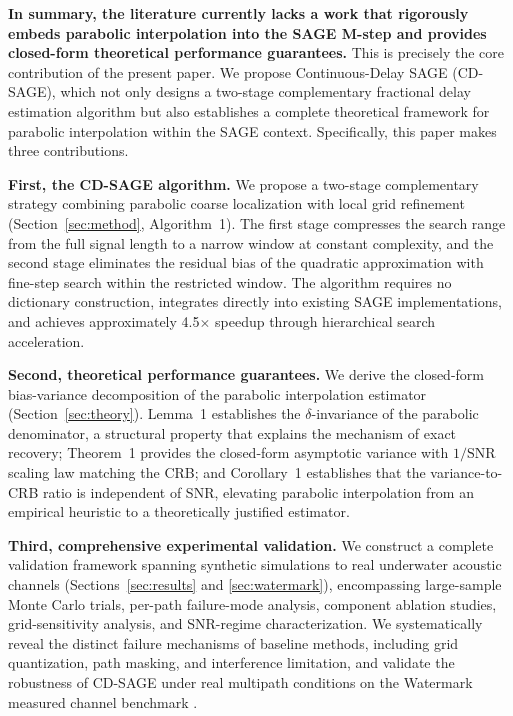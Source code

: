 \documentclass[a4paper,fleqn]{cas-dc}
\begin{document}
\textbf{In summary, the literature currently lacks a work that rigorously embeds parabolic interpolation into the SAGE M-step and provides closed-form theoretical performance guarantees.} This is precisely the core contribution of the present paper. We propose Continuous-Delay SAGE (CD-SAGE), which not only designs a two-stage complementary fractional delay estimation algorithm but also establishes a complete theoretical framework for parabolic interpolation within the SAGE context. Specifically, this paper makes three contributions.

\textbf{First, the CD-SAGE algorithm.} We propose a two-stage complementary strategy combining parabolic coarse localization with local grid refinement (Section~\ref{sec:method}, Algorithm~1). The first stage compresses the search range from the full signal length to a narrow window at constant complexity, and the second stage eliminates the residual bias of the quadratic approximation with fine-step search within the restricted window. The algorithm requires no dictionary construction, integrates directly into existing SAGE implementations, and achieves approximately 4.5$\times$ speedup through hierarchical search acceleration.

\textbf{Second, theoretical performance guarantees.} We derive the closed-form bias-variance decomposition of the parabolic interpolation estimator (Section~\ref{sec:theory}). Lemma~1 establishes the $\delta$-invariance of the parabolic denominator, a structural property that explains the mechanism of exact recovery; Theorem~1 provides the closed-form asymptotic variance with $1/\mathrm{SNR}$ scaling law matching the CRB; and Corollary~1 establishes that the variance-to-CRB ratio is independent of SNR, elevating parabolic interpolation from an empirical heuristic to a theoretically justified estimator.

\textbf{Third, comprehensive experimental validation.} We construct a complete validation framework spanning synthetic simulations to real underwater acoustic channels (Sections~\ref{sec:results} and \ref{sec:watermark}), encompassing large-sample Monte Carlo trials, per-path failure-mode analysis, component ablation studies, grid-sensitivity analysis, and SNR-regime characterization. We systematically reveal the distinct failure mechanisms of baseline methods, including grid quantization, path masking, and interference limitation, and validate the robustness of CD-SAGE under real multipath conditions on the Watermark measured channel benchmark \cite{vanwalreeWatermarkBenchmarkUnderwater2017}.
\end{document}
